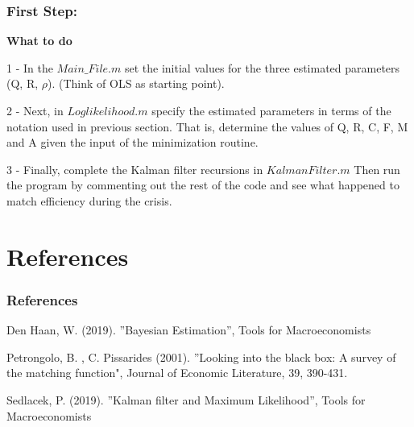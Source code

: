 \documentclass[notes=show]{beamer}%
\makeatletter
\let\beamer@writeslidentry@miniframeson=\beamer@writeslidentry
\def\beamer@writeslidentry@miniframesoff{  \expandafter\beamer@ifempty\expandafter{\beamer@framestartpage}{}  {        \clearpage\beamer@notesactions  }
}
\newcommand*{\miniframeson}
{\let\beamer@writeslidentry=\beamer@writeslidentry@miniframeson}
\newcommand*{\miniframesoff}
{\let\beamer@writeslidentry=\beamer@writeslidentry@miniframesoff}
\makeatother
\begin{document}
\begin{frame}

\frametitle{First Step:}
\textbf{What to do} \\
\bigskip

1 - In the $Main\_File.m$ set the initial values for the three estimated parameters (Q, R, $\rho$). (Think of OLS as starting point).\\ \bigskip

2 -  Next, in $Loglikelihood.m$ specify the estimated parameters in terms of the notation used in previous section. That is, determine the values of Q, R, C, F, M and A given the input of the minimization routine. \\ \bigskip

3 - Finally, complete the Kalman filter recursions in $KalmanFilter.m$ Then run the program by commenting out the rest of the code and see what happened to match efficiency during the crisis.
\end{frame}


\miniframesoff
\section{References}

\miniframeson

\begin{frame}

\frametitle{References}

Den Haan, W. (2019). ''Bayesian Estimation'', Tools for Macroeconomists

Petrongolo, B. , C. Pissarides (2001). ''Looking into the black box: A survey of the
matching function", Journal of Economic Literature, 39, 390-431. \\ \bigskip

Sedlacek, P. (2019). ''Kalman filter and Maximum Likelihood'', Tools for Macroeconomists\\ \bigskip

\end{frame}
\end{document}
